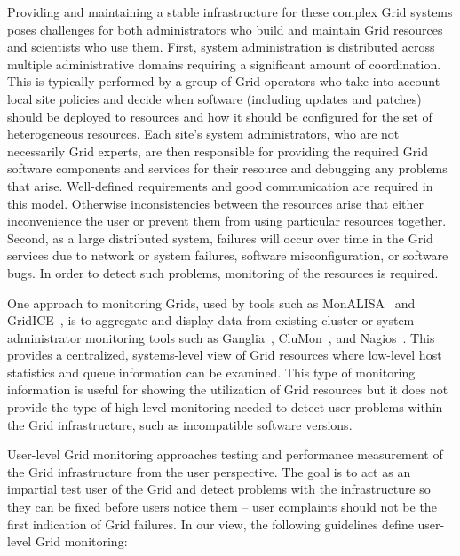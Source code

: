 \documentclass[times,10pt,twocolumn]{article}
\begin{document}
Providing and maintaining a stable infrastructure for these complex 
Grid systems poses challenges for both administrators who build and
maintain Grid resources and scientists who use them.  First, system
administration is distributed across multiple administrative domains 
requiring a significant amount of coordination.  This is typically performed by
a group of Grid operators who take into account local site policies 
and decide when software (including updates and patches) should be deployed to
resources and how it should be configured for the set of heterogeneous
resources.  Each site's system administrators, who are not necessarily Grid
experts, are then responsible for providing the required Grid software
components and services for their resource and debugging any problems that
arise.  Well-defined requirements and good communication are required in this
model.  Otherwise inconsistencies between the resources arise that either
inconvenience the user or prevent them from using particular resources
together.  Second, as a large distributed system, failures will occur over
time in the Grid services due to network or system failures, software
misconfiguration, or software bugs.  In order to detect such problems, 
monitoring of the resources is required.  

One approach to monitoring Grids, used by tools such as
MonALISA~\cite{monalisa} and GridICE~\cite{gridice}, is to aggregate and
display data from existing cluster or system administrator monitoring tools
such as Ganglia~\cite{ganglia}, CluMon~\cite{clumon}, and
Nagios~\cite{nagios}.  This provides a centralized, systems-level view of Grid
resources where low-level host statistics and queue information can be
examined.  This type of monitoring information is useful for showing the
utilization of Grid resources but it does not provide the type of
high-level monitoring needed to detect user problems within the Grid
infrastructure, such as incompatible software versions.  

User-level Grid monitoring approaches testing and performance measurement of
the Grid infrastructure from the user perspective.  The goal is to act as an
impartial test user of the Grid and detect problems with the infrastructure so
they can be fixed before users notice them -- user complaints should not be
the first indication of Grid failures.  In our view, the following guidelines 
define user-level Grid monitoring: 
\end{document}
